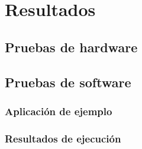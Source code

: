 \chapter{Resultados}

\section{Pruebas de hardware}

\section{Pruebas de software}

\subsection{Aplicaci\'on de ejemplo}

\subsection{Resultados de ejecuci\'on}

